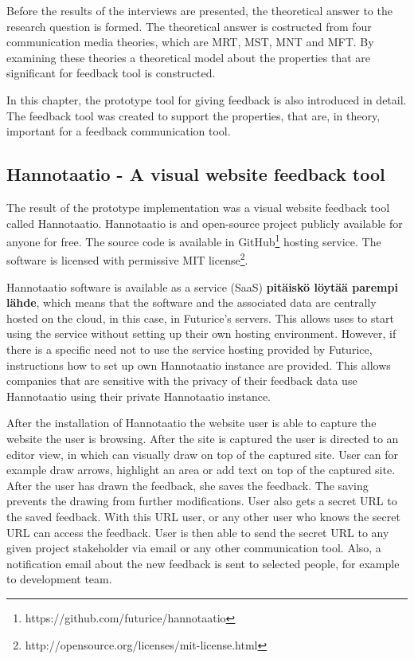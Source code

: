 \documentclass[english,12pt,a4paper,pdftex]{article}
\begin{document}
Before the results of the interviews are presented, the theoretical answer to the research question is formed. The theoretical answer is costructed from four communication media theories, which are \ac{MRT}, \ac{MST}, \ac{MNT} and \ac{MFT}. By examining these theories a theoretical model about the properties that are significant for feedback tool is constructed.

In this chapter, the prototype tool for giving feedback is also introduced in detail. The feedback tool was created to support the properties, that are, in theory, important for a feedback communication tool.

\subsection{Hannotaatio - A visual website feedback tool}

The result of the prototype implementation was a visual website feedback tool called Hannotaatio. Hannotaatio is and open-source project publicly available for anyone for free. The source code is available in GitHub\footnote{https://github.com/futurice/hannotaatio} hosting service. The software is licensed with permissive MIT license\footnote{http://opensource.org/licenses/mit-license.html}.

Hannotaatio software is available as a service (SaaS) \citep{saas} \textbf{pitäiskö löytää parempi lähde}, which means that the software and the associated data are centrally hosted on the cloud, in this case, in Futurice's servers. This allows uses to start using the service without setting up their own hosting environment. However, if there is a specific need not to use the service hosting provided by Futurice, instructions how to set up own Hannotaatio instance are provided. This allows companies that are sensitive with the privacy of their feedback data use Hannotaatio using their private Hannotaatio instance.

After the installation of Hannotaatio the website user is able to capture the website the user is browsing. After the site is captured the user is directed to an editor view, in which can visually draw on top of the captured site. User can for example draw arrows, highlight an area or add text on top of the captured site. After the user has drawn the feedback, she saves the feedback. The saving prevents the drawing from further modifications. User also gets a secret \ac{URL} to the saved feedback. With this \ac{URL} user, or any other user who knows the secret \ac{URL} can access the feedback. User is then able to send the secret \ac{URL} to any given project stakeholder via email or any other communication tool. Also, a notification email about the new feedback is sent to selected people, for example to development team.
\end{document}
